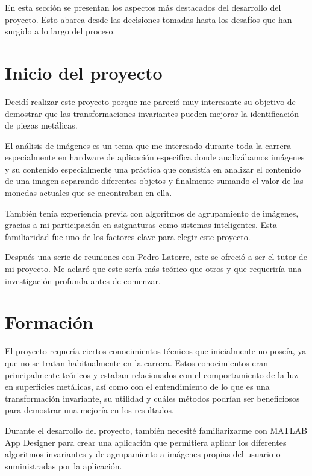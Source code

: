 
En esta sección se presentan los aspectos más destacados del desarrollo del proyecto. Esto abarca desde las decisiones tomadas hasta los desafíos que han surgido a lo largo del proceso.

\section{Inicio del proyecto}\label{inicio-del-proyecto}

Decidí realizar este proyecto porque me pareció muy interesante su objetivo de demostrar que las transformaciones invariantes pueden mejorar la identificación de piezas metálicas.

El análisis de imágenes es un tema que me interesado durante toda la carrera especialmente en hardware de aplicación especifica donde analizábamos imágenes y su contenido especialmente una práctica que consistía en analizar el contenido de una imagen separando diferentes objetos y finalmente sumando el valor de las monedas actuales que se encontraban en ella.

También tenía experiencia previa con algoritmos de agrupamiento de imágenes, gracias a mi participación en asignaturas como sistemas inteligentes. Esta familiaridad fue uno de los factores clave para elegir este proyecto. 

Después una serie de reuniones con Pedro Latorre, este se ofreció a ser el tutor de mi proyecto. Me aclaró que este sería más teórico que otros y que requeriría una investigación profunda antes de comenzar.

\section{Formación}\label{Formación}

El proyecto requería ciertos conocimientos técnicos que inicialmente no poseía, ya que no se tratan habitualmente en la carrera. Estos conocimientos eran principalmente teóricos y estaban relacionados con el comportamiento de la luz en superficies metálicas, así como con el entendimiento de lo que es una transformación invariante, su utilidad y cuáles métodos podrían ser beneficiosos para demostrar una mejoría en los resultados.

Durante el desarrollo del proyecto, también necesité familiarizarme con MATLAB App Designer para crear una aplicación que permitiera aplicar los diferentes algoritmos invariantes y de agrupamiento a imágenes propias del usuario o suministradas por la aplicación.

